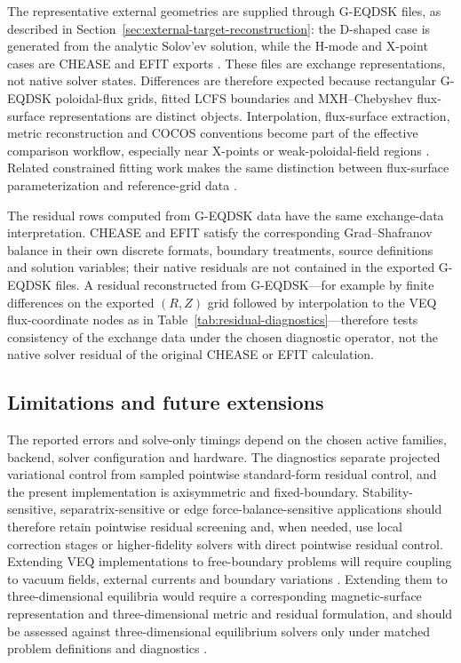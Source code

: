 \documentclass[final, 3p, times]{elsarticle}
\begin{document}
The representative external geometries are supplied through G-EQDSK files, as described in Section~\ref{sec:external-target-reconstruction}: the D-shaped case is generated from the analytic Solov'ev solution, while the H-mode and X-point cases are CHEASE and EFIT exports \cite{Lutjens1996,Lao1985,FreeQDSKGeqdsk}. These files are exchange representations, not native solver states. Differences are therefore expected because rectangular G-EQDSK poloidal-flux grids, fitted LCFS boundaries and MXH--Chebyshev flux-surface representations are distinct objects. Interpolation, flux-surface extraction, metric reconstruction and COCOS conventions become part of the effective comparison workflow, especially near X-points or weak-poloidal-field regions \cite{Sauter2013,Kripner2019PLEQUE,Garcia2022INGRID}. Related constrained fitting work makes the same distinction between flux-surface parameterization and reference-grid data \cite{Snoep2023}.

The residual rows computed from G-EQDSK data have the same exchange-data interpretation. CHEASE and EFIT satisfy the corresponding Grad--Shafranov balance in their own discrete formats, boundary treatments, source definitions and solution variables; their native residuals are not contained in the exported G-EQDSK files. A residual reconstructed from G-EQDSK---for example by finite differences on the exported $(R,Z)$ grid followed by interpolation to the VEQ flux-coordinate nodes as in Table~\ref{tab:residual-diagnostics}---therefore tests consistency of the exchange data under the chosen diagnostic operator, not the native solver residual of the original CHEASE or EFIT calculation.

\subsection{Limitations and future extensions}

The reported errors and solve-only timings depend on the chosen active families, backend, solver configuration and hardware. The diagnostics separate projected variational control from sampled pointwise standard-form residual control, and the present implementation is axisymmetric and fixed-boundary. Stability-sensitive, separatrix-sensitive or edge force-balance-sensitive applications should therefore retain pointwise residual screening and, when needed, use local correction stages or higher-fidelity solvers with direct pointwise residual control. Extending VEQ implementations to free-boundary problems will require coupling to vacuum fields, external currents and boundary variations \cite{Amorisco2024}. Extending them to three-dimensional equilibria would require a corresponding magnetic-surface representation and three-dimensional metric and residual formulation, and should be assessed against three-dimensional equilibrium solvers only under matched problem definitions and diagnostics \cite{Hirshman1983,Dudt2020}.
\end{document}
